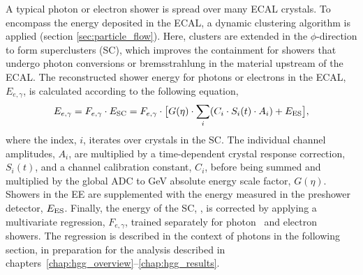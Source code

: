 A typical photon or electron shower is spread over many ECAL crystals. To encompass the energy deposited in the ECAL, a dynamic clustering algorithm is applied (section \ref{sec:particle_flow}). Here, clusters are extended in the $\phi$-direction to form superclusters (SC), which improves the containment for showers that undergo photon conversions or bremsstrahlung in the material upstream of the ECAL. The reconstructed shower energy for photons or electrons in the ECAL, $E_{e,\gamma}$, is calculated according to the following equation,
\begin{equation}\label{eq:ecal_corrections}
    E_{e,\gamma} = F_{e,\gamma} \cdot E_{\rm{SC}} = F_{e,\gamma} \cdot \big[ G(\eta) \cdot \sum_i (C_i \cdot S_i(t) \cdot A_i) + E_{\rm{ES}} \big],
\end{equation}
\noindent
where the index, $i$, iterates over crystals in the SC. The individual channel amplitudes, $A_i$, are multiplied by a time-dependent crystal response correction, $S_i(t)$, and a channel calibration constant, $C_i$, before being summed and multiplied by the global ADC to GeV absolute energy scale factor, $G(\eta)$. Showers in the EE are supplemented with the energy measured in the preshower detector, $E_{\rm{ES}}$. Finally, the energy of the SC, \Eraw, is corrected by applying a multivariate regression, $F_{e,\gamma}$, trained separately for photon~\cite{Khachatryan:2015iwa} and electron~\cite{Khachatryan:2015hwa} showers. The regression is described in the context of photons in the following section, in preparation for the \Hgg analysis described in chapters~\ref{chap:hgg_overview}--\ref{chap:hgg_results}.

